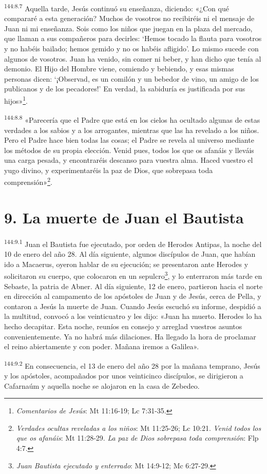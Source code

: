 \par
\textsuperscript{144:8.7} Aquella tarde, Jesús continuó su enseñanza, diciendo: «¿Con qué compararé a esta generación? Muchos de vosotros no recibiréis ni el mensaje de Juan ni mi enseñanza. Sois como los niños que juegan en la plaza del mercado, que llaman a sus compañeros para decirles: `Hemos tocado la flauta para vosotros y no habéis bailado; hemos gemido y no os habéis afligido'. Lo mismo sucede con algunos de vosotros. Juan ha venido, sin comer ni beber, y han dicho que tenía al demonio. El Hijo del Hombre viene, comiendo y bebiendo, y esas mismas personas dicen: `¡Observad, es un comilón y un bebedor de vino, un amigo de los publicanos y de los pecadores!' En verdad, la sabiduría es justificada por sus hijos»\footnote{\textit{Comentarios de Jesús}: Mt 11:16-19; Lc 7:31-35.}.

\par
\textsuperscript{144:8.8} «Parecería que el Padre que está en los cielos ha ocultado algunas de estas verdades a los sabios y a los arrogantes, mientras que las ha revelado a los niños. Pero el Padre hace bien todas las cosas; el Padre se revela al universo mediante los métodos de su propia elección. Venid pues, todos los que os afanáis y lleváis una carga pesada, y encontraréis descanso para vuestra alma. Haced vuestro el yugo divino, y experimentaréis la paz de Dios, que sobrepasa toda comprensión»\footnote{\textit{Verdades ocultas reveladas a los niños}: Mt 11:25-26; Lc 10:21. \textit{Venid todos los que os afanáis}: Mt 11:28-29. \textit{La paz de Dios sobrepasa toda comprensión}: Flp 4:7.}.

\section*{9. La muerte de Juan el Bautista}
\par
\textsuperscript{144:9.1} Juan el Bautista fue ejecutado, por orden de Herodes Antipas, la noche del 10 de enero del año 28. Al día siguiente, algunos discípulos de Juan, que habían ido a Macaerus, oyeron hablar de su ejecución; se presentaron ante Herodes y solicitaron su cuerpo, que colocaron en un sepulcro\footnote{\textit{Juan Bautista ejecutado y enterrado}: Mt 14:9-12; Mc 6:27-29.}, y lo enterraron más tarde en Sebaste, la patria de Abner. Al día siguiente, 12 de enero, partieron hacia el norte en dirección al campamento de los apóstoles de Juan y de Jesús, cerca de Pella, y contaron a Jesús la muerte de Juan. Cuando Jesús escuchó su informe, despidió a la multitud, convocó a los veinticuatro y les dijo: «Juan ha muerto. Herodes lo ha hecho decapitar. Esta noche, reuníos en consejo y arreglad vuestros asuntos convenientemente. Ya no habrá más dilaciones. Ha llegado la hora de proclamar el reino abiertamente y con poder. Mañana iremos a Galilea».

\par
\textsuperscript{144:9.2} En consecuencia, el 13 de enero del año 28 por la mañana temprano, Jesús y los apóstoles, acompañados por unos veinticinco discípulos, se dirigieron a Cafarnaúm y aquella noche se alojaron en la casa de Zebedeo.